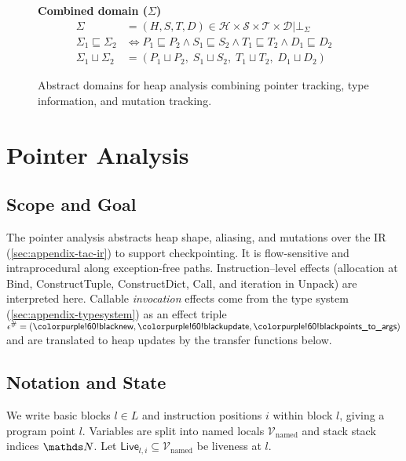 \begin{figure*}[t]
\vspace{1.5em}

\noindent\textbf{Combined domain ($\Sigma$)}
\begin{align*}
\Sigma &= (H,S,T,D) \in \mathcal{H} \times \mathcal{S} \times \mathcal{T} \times \mathcal{D} | \bot_\Sigma\\[0.3em]
\Sigma_1 \sqsubseteq \Sigma_2 &\iff P_1 \sqsubseteq P_2 \land S_1 \sqsubseteq S_2 \land T_1 \sqsubseteq T_2 \land D_1 \sqsubseteq D_2 \\[0.3em]
\Sigma_1 \sqcup \Sigma_2 &= (P_1 \sqcup P_2,\; S_1 \sqcup S_2,\; T_1 \sqcup T_2,\; D_1 \sqcup D_2)
\end{align*}

\caption{Abstract domains for heap analysis combining pointer tracking, type information, and mutation tracking.}
\label{fig:abstract-domains}
\end{figure*}

\newpage
\section{Pointer Analysis}
\label{sec:appendix-pointer}

\subsection{Scope and Goal}

The pointer analysis abstracts heap shape, aliasing, and mutations over the \spytecode IR
(\cref{sec:appendix-tac-ir}) to support checkpointing. It is
flow-sensitive and intraprocedural along exception-free paths.
Instruction–level effects (allocation at \textsf{Bind}, \textsf{ConstructTuple},
\textsf{ConstructDict}, \textsf{Call}, and iteration in \textsf{Unpack}) are interpreted here.
Callable \emph{invocation} effects come from the type system
(\cref{sec:appendix-typesystem}) as an effect triple
\(\epsilon^\#=(\tnew,\tupdate,\tptstoargs)\) and are translated to
heap updates by the transfer functions below.

\subsection{Notation and State}

We write basic blocks \(l\in L\) and instruction positions \(i\) within block \(l\), giving a program point \(l\).
Variables are split into named locals \(\mathcal{V}_{\mathrm{named}}\) and stack stack indices $\tN$.
Let \(\mathsf{Live}_{l,i}\subseteq \mathcal{V}_{\mathrm{named}}\) be liveness at \(l\).

